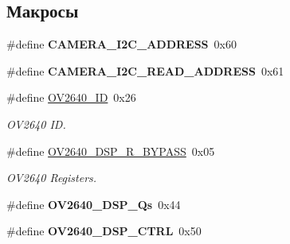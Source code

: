 \subsection*{Макросы}
\begin{DoxyCompactItemize}
\item 
\mbox{\label{group___o_v2640___exported___constants_ga823cb7ece14931bb4bf0c7f7311c5c28}} 
\#define {\bfseries C\+A\+M\+E\+R\+A\+\_\+\+I2\+C\+\_\+\+A\+D\+D\+R\+E\+SS}~0x60
\item 
\mbox{\label{group___o_v2640___exported___constants_ga8a2415a823847c0d741e6a52e658e889}} 
\#define {\bfseries C\+A\+M\+E\+R\+A\+\_\+\+I2\+C\+\_\+\+R\+E\+A\+D\+\_\+\+A\+D\+D\+R\+E\+SS}~0x61
\item 
\mbox{\label{group___o_v2640___exported___constants_gada73aa369f213f96ccf447b20f039616}} 
\#define \hyperlink{group___o_v2640___exported___constants_gada73aa369f213f96ccf447b20f039616}{O\+V2640\+\_\+\+ID}~0x26
\begin{DoxyCompactList}\small\item\em O\+V2640 ID. \end{DoxyCompactList}\item 
\mbox{\label{group___o_v2640___exported___constants_gabf51f43f96b6a515ed215d42f72f808c}} 
\#define \hyperlink{group___o_v2640___exported___constants_gabf51f43f96b6a515ed215d42f72f808c}{O\+V2640\+\_\+\+D\+S\+P\+\_\+\+R\+\_\+\+B\+Y\+P\+A\+SS}~0x05
\begin{DoxyCompactList}\small\item\em O\+V2640 Registers. \end{DoxyCompactList}\item 
\mbox{\label{group___o_v2640___exported___constants_gaa8abd32722a40862c1ff9347f1a83b08}} 
\#define {\bfseries O\+V2640\+\_\+\+D\+S\+P\+\_\+\+Qs}~0x44
\item 
\mbox{\label{group___o_v2640___exported___constants_ga6efeb79bbac50f4be85ca39953391113}} 
\#define {\bfseries O\+V2640\+\_\+\+D\+S\+P\+\_\+\+C\+T\+RL}~0x50
\item 

\end{DoxyCompactItemize}
